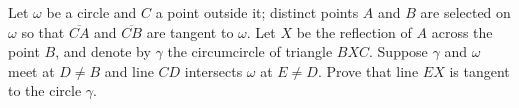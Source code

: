 Let $\omega$ be a circle and $C$ a point outside it; distinct points $A$ and $B$ are selected on $\omega$ so that $\overline{CA}$ and $\overline{CB}$ are tangent to $\omega$. Let $X$ be the reflection of $A$ across the point $B$, and denote by $\gamma$ the circumcircle of triangle $BXC$. Suppose $\gamma$ and $\omega$ meet at $D \neq B$ and line $CD$ intersects $\omega$ at $E \neq D$. Prove that line $EX$ is tangent to the circle $\gamma$.